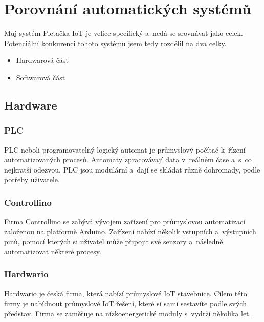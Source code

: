\chapter{Porovnání automatických systémů}
Můj systém Pletačka IoT je velice specifický a~nedá se srovnávat jako celek. 
Potenciální konkurenci tohoto systému jsem tedy rozdělil na dva celky.

\begin{itemize} %
    \item Hardwarová část
    \item Softwarová část
\end{itemize}



\section{Hardware}

\subsection{PLC}
PLC neboli programovatelný logický automat je průmyslový počítač k~řízení automatizovaných procesů.
Automaty zpracovávají data v~reálném čase a~s~co nejkratší odezvou.
PLC jsou modulární a~dají se skládat různě dohromady, podle potřeby uživatele.



\subsection{Controllino}
Firma Controllino\cite{CONTROLLINO} se zabývá vývojem zařízení pro průmyslovou automatizaci založenou na platformě Arduino.
Zařízení nabízí několik vstupních a~výstupních pinů, pomocí kterých si uživatel může připojit své senzory a~následně automatizovat některé procesy. 




\subsection{Hardwario}
Hardwario\cite{HARDWARIO} je česká firma, která nabízí průmyslové IoT stavebnice.
Cílem této firmy je nabídnout průmyslové IoT řešení, které si sami sestavíte podle svých představ.
Firma se zaměřuje na nízkoenergetické moduly s~vydrží několika let.



